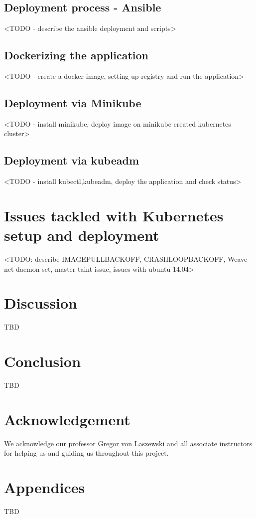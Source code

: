 \documentclass[9pt,twocolumn,twoside]{../../styles/osajnl}
\begin{document}
\subsection{Deployment process - Ansible}
<TODO - describe the ansible deployment and scripts>

\subsection{Dockerizing the application}
<TODO - create a docker image, setting up registry and run the application>

\subsection{Deployment via Minikube}
<TODO - install minikube, deploy image on minikube created kubernetes cluster>

\subsection{Deployment via kubeadm}
<TODO - install kubectl,kubeadm, deploy the application and check status>

\section{Issues tackled with Kubernetes setup and deployment}
<TODO: describe IMAGEPULLBACKOFF, CRASHLOOPBACKOFF,
Weave-net daemon set, master taint issue, issues with ubuntu 14.04>

\section{Discussion}
TBD

\section{Conclusion}

TBD

\section{Acknowledgement}

We acknowledge our professor Gregor von Laszewski and all associate
instructors for helping us and guiding us throughout this project.

\section{Appendices}
TBD


 
\end{document}
